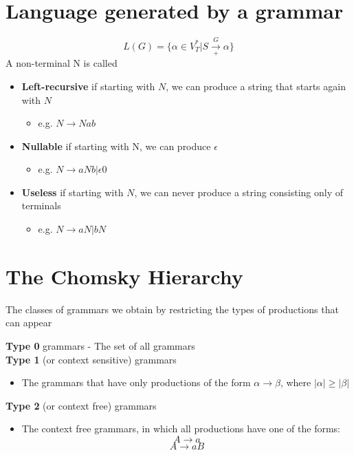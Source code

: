 \documentclass{article}[18pt]
\begin{document}
\section{Language generated by a grammar}
$$L(G)=\{\alpha\in V^*_T| S\xrightarrow[+]{G} \alpha \}$$
A non-terminal N is called
\begin{itemize}
	\item \textbf{Left-recursive} if starting with $N$, we can produce a string that starts again with $N$
	\begin{itemize}
		\item e.g. $N\rightarrow Nab$
	\end{itemize}
	\item \textbf{Nullable} if starting with N, we can produce $\epsilon$
	\begin{itemize}
		\item e.g. $N\rightarrow aNb | \epsilon$0
	\end{itemize}
	\item \textbf{Useless} if starting with $N$, we can never produce a string consisting only of terminals
	\begin{itemize}
		\item e.g. $N\rightarrow aN | bN$
	\end{itemize}
\end{itemize}
\section{The Chomsky Hierarchy}
\begin{definition}
The classes of grammars we obtain by restricting the types of productions that can appear
\end{definition}
\textbf{Type 0} grammars - The set of all grammars\\
\textbf{Type 1} (or context sensitive) grammars
\begin{itemize}
	\item The grammars that have only productions of the form $\alpha \rightarrow \beta$, where $|\alpha| \geqslant |\beta|$
\end{itemize}
\textbf{Type 2} (or context free) grammars
\begin{itemize}
	\item The context free grammars, in which all productions have one of the forms:
$$A\rightarrow a$$
$$A\rightarrow aB$$
\end{itemize}
\end{document}
